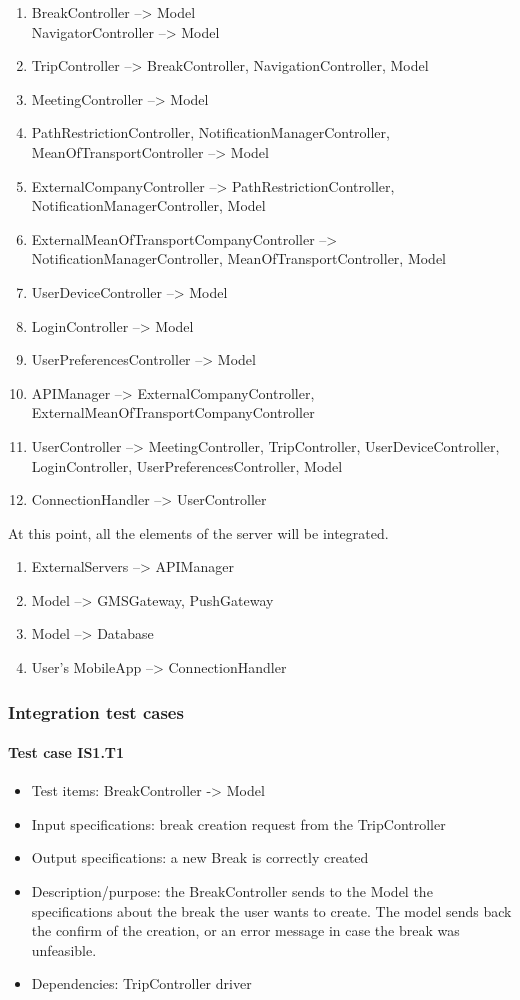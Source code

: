 \documentclass[a4paper,leqno]{article}
\begin{document}
\begin{enumerate}
	\item BreakController --> Model\\
	      NavigatorController --> Model
	\item TripController --> BreakController, NavigationController, Model
	\item MeetingController --> Model
	\item PathRestrictionController, NotificationManagerController, MeanOfTransportController --> Model
	\item ExternalCompanyController --> PathRestrictionController, NotificationManagerController, Model
	\item ExternalMeanOfTransportCompanyController --> NotificationManagerController, MeanOfTransportController, Model
	\item UserDeviceController --> Model
	\item LoginController --> Model
	\item UserPreferencesController --> Model
	\item APIManager --> ExternalCompanyController, ExternalMeanOfTransportCompanyController
	\item UserController --> MeetingController, TripController, UserDeviceController, LoginController, UserPreferencesController, Model
	\item ConnectionHandler --> UserController
\end{enumerate}

At this point, all the elements of the server will be integrated.
\begin{enumerate}
	\item ExternalServers --> APIManager
	\item Model --> GMSGateway, PushGateway
	\item Model --> Database
	\item User's MobileApp --> ConnectionHandler
\end{enumerate}

\subsubsection{Integration test cases}

\paragraph{Test case IS1.T1}
\begin{itemize}
	\item Test items: BreakController -> Model
	\item Input specifications: break creation request from the TripController
	\item Output specifications: a new Break is correctly created
	\item Description/purpose: the BreakController sends to the Model the specifications about the break the user wants to create. The model sends back the confirm of the creation, or an error message in case the break was unfeasible.
	\item Dependencies: TripController driver
\end{itemize}
\end{document}
